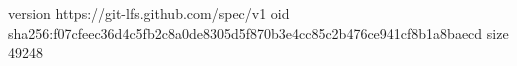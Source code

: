 version https://git-lfs.github.com/spec/v1
oid sha256:f07cfeec36d4c5fb2c8a0de8305d5f870b3e4cc85c2b476ce941cf8b1a8baecd
size 49248
